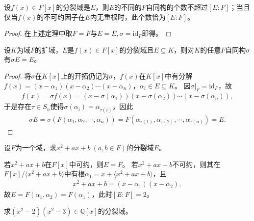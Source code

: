 \documentclass[../../main.tex]{subfiles}%
\begin{document}
\begin{corollary}
设$f(x)\in F[x]$的分裂域是$E$，则$E$的不同的$F$自同构的个数不超过$[E:F]$；当且仅当$f(x)$的不可约因子在$E$内无重根时，此个数恰为$[E:F]$。
\end{corollary}

\begin{proof}

在上述定理中取$F=\overline{F}$与$E=\overline{E},\sigma=\mathrm{id}_F$即得。

\end{proof}

\begin{corollary}
设$K$为域$F$的扩域，$E$是$f(x)\in F[x]$的分裂域且$E\subseteq K$，则对$K$的任意$F$自同构$\sigma$有$\sigma E=E$。
\end{corollary}

\begin{proof}

将$\sigma$在$K[x]$上的开拓仍记为$\sigma$，$f(x)$在$K[x]$中有分解$f(x)=(x-\alpha_1)(x-\alpha_2)\cdots(x-\alpha_n)$，$\alpha_i\in E\subseteq K$。
因$\sigma|_F=\mathrm{id}_F$，故
\begin{align*}
f(x)=\sigma f(x)=(x-\sigma(\alpha_1))(x-\sigma(\alpha_2))\cdots(x-\sigma(\alpha_n)),
\end{align*}
于是存在$\tau\in S_n$使得$\sigma(\alpha_i)=\alpha_{\tau(i)}$，因此
\begin{align*}
\sigma E=\sigma(F(\alpha_1,\alpha_2,\cdots,\alpha_n))=F(\alpha_{\tau(1)},\alpha_{\tau(2)},\cdots,\alpha_{\tau(n)})=E.
\end{align*}

\end{proof}

\begin{example}
设$F$为一个域，求$x^2+ax+b\ (a,b\in F)$的分裂域$E$。
\end{example}

\begin{solution}

若$x^2+ax+b$在$F[x]$中可约，则$E=F$。
若$x^2+ax+b$不可约，则其在$F[x]/\langle x^2+ax+b\rangle$中有根$\alpha_1=x+\langle x^2+ax+b\rangle$，且
\begin{align*}
x^2+ax+b=(x-\alpha_1)(x-\alpha_2),
\end{align*}
故$E=F(\alpha_1,\alpha_2)=F(\alpha_1)$，此时$[E:F]=2$。

\end{solution}

\begin{example}
求$(x^2-2)(x^2-3)\in\mathbb{Q}[x]$的分裂域。
\end{example}
\end{document}
